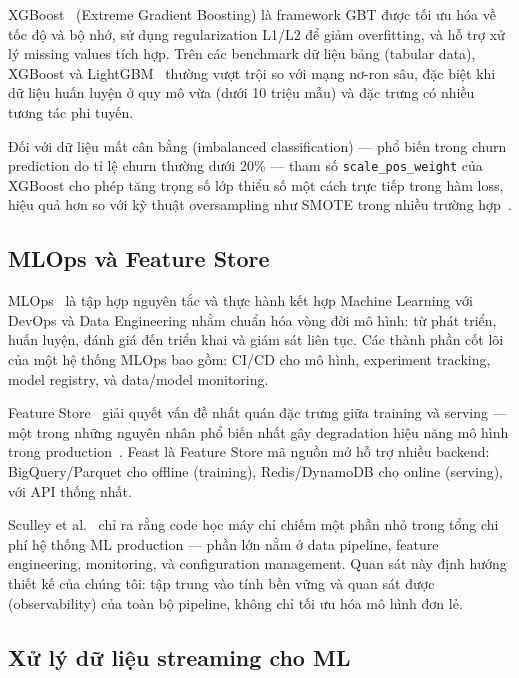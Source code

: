 \documentclass[conference]{IEEEtran}
\begin{document}
XGBoost~\cite{chen2016xgboost} (Extreme Gradient Boosting) là framework GBT
được tối ưu hóa về tốc độ và bộ nhớ, sử dụng regularization L1/L2 để giảm
overfitting, và hỗ trợ xử lý missing values tích hợp. Trên các benchmark dữ
liệu bảng (tabular data), XGBoost và LightGBM~\cite{ke2017lightgbm} thường
vượt trội so với mạng nơ-ron sâu, đặc biệt khi dữ liệu huấn luyện ở quy mô
vừa (dưới 10 triệu mẫu) và đặc trưng có nhiều tương tác phi tuyến.

Đối với dữ liệu mất cân bằng (imbalanced classification) — phổ biến trong
churn prediction do tỉ lệ churn thường dưới 20\% — tham số
\texttt{scale\_pos\_weight} của XGBoost cho phép tăng trọng số lớp thiểu số
một cách trực tiếp trong hàm loss, hiệu quả hơn so với kỹ thuật oversampling
như SMOTE trong nhiều trường hợp~\cite{he2009learning}.

\subsection{MLOps và Feature Store}

MLOps~\cite{kreuzberger2023machine} là tập hợp nguyên tắc và thực hành kết
hợp Machine Learning với DevOps và Data Engineering nhằm chuẩn hóa vòng đời
mô hình: từ phát triển, huấn luyện, đánh giá đến triển khai và giám sát liên
tục. Các thành phần cốt lõi của một hệ thống MLOps bao gồm: CI/CD cho mô
hình, experiment tracking, model registry, và data/model monitoring.

Feature Store~\cite{feast} giải quyết vấn đề nhất quán đặc trưng giữa
training và serving — một trong những nguyên nhân phổ biến nhất gây degradation
hiệu năng mô hình trong production~\cite{sculley2015hidden}. Feast là Feature
Store mã nguồn mở hỗ trợ nhiều backend: BigQuery/Parquet cho offline (training),
Redis/DynamoDB cho online (serving), với API thống nhất.

Sculley et al.~\cite{sculley2015hidden} chỉ ra rằng code học máy chỉ chiếm
một phần nhỏ trong tổng chi phí hệ thống ML production — phần lớn nằm ở data
pipeline, feature engineering, monitoring, và configuration management. Quan
sát này định hướng thiết kế của chúng tôi: tập trung vào tính bền vững và
quan sát được (observability) của toàn bộ pipeline, không chỉ tối ưu hóa mô
hình đơn lẻ.

\subsection{Xử lý dữ liệu streaming cho ML}
\end{document}
